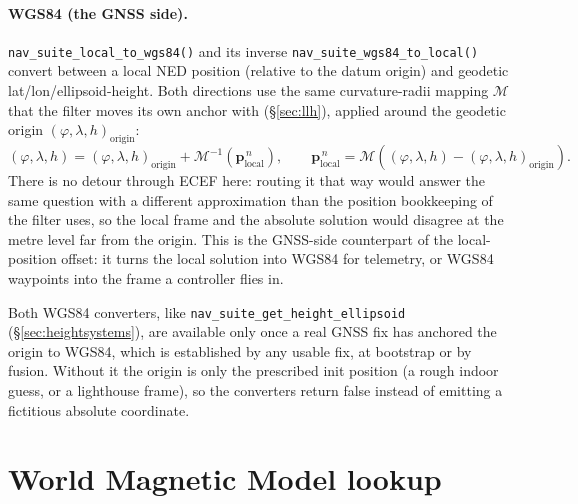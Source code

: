 \documentclass[11pt,a4paper]{article}
\newcommand{\vect}[1]{\bm{#1}}
\newcommand{\code}[1]{\texttt{#1}}
\begin{document}
\paragraph{WGS84 (the GNSS side).} \code{nav\_\allowbreak{}suite\_\allowbreak{}local\_\allowbreak{}to\_\allowbreak{}wgs84()}
and its inverse \code{nav\_\allowbreak{}suite\_\allowbreak{}wgs84\_\allowbreak{}to\_\allowbreak{}local()} convert between a
local NED position (relative to the datum origin) and geodetic
lat/lon/ellipsoid-height. Both directions use the same curvature-radii
mapping $\mathcal{M}$ that the filter moves its own anchor with
(\S\ref{sec:llh}), applied around the geodetic origin
$(\varphi,\lambda,h)_{\text{origin}}$:
\begin{equation}
  (\varphi,\lambda,h) = (\varphi,\lambda,h)_{\text{origin}}
    + \mathcal{M}^{-1}\!\left(\vect{p}_{\text{local}}^{\,n}\right),
  \qquad
  \vect{p}_{\text{local}}^{\,n} = \mathcal{M}\!\left(
    (\varphi,\lambda,h) - (\varphi,\lambda,h)_{\text{origin}} \right).
\end{equation}
There is no detour through ECEF here: routing it that way
would answer the same question with a different approximation than the
position bookkeeping of the filter uses, so the local frame and the
absolute solution would disagree at the metre level far from the origin.
This is the GNSS-side counterpart of the local-position offset: it turns
the local solution into WGS84 for telemetry, or WGS84 waypoints into the
frame a controller flies in.

Both WGS84 converters, like \code{nav\_\allowbreak{}suite\_\allowbreak{}get\_\allowbreak{}height\_\allowbreak{}ellipsoid}
(\S\ref{sec:heightsystems}), are available only once a real GNSS fix has
anchored the origin to WGS84, which is established by any usable fix, at
bootstrap or by fusion. Without it the origin is only the prescribed
init position (a rough indoor guess, or a lighthouse frame), so the
converters return false instead of emitting a fictitious absolute
coordinate.

\section{World Magnetic Model lookup}
\label{sec:wmm}
\end{document}
